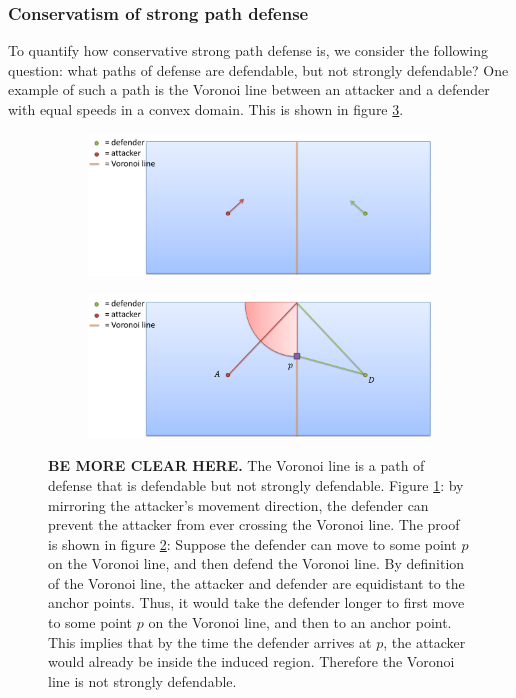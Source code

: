 \subsubsection{Conservatism of strong path defense}
To quantify how conservative strong path defense is, we consider the following question: what paths of defense are defendable, but not strongly defendable? One example of such a path is the Voronoi line between an attacker and a defender with equal speeds in a convex domain. This is shown in figure \ref{fig:voronoi_pod}.

\begin{figure}[h]
\centering

\begin{subfigure}{\textwidth}
\includegraphics[width=\textwidth]{"fig/voronoi path of defense"}
\caption{}
\label{subfig:vor_pod1}
\end{subfigure}

\begin{subfigure}{\textwidth}
\includegraphics[width=\textwidth]{"fig/voronoi path of defense proof"}
\caption{}
\label{subfig:vor_pod2}
\end{subfigure}

\caption{\textbf{BE MORE CLEAR HERE.} The Voronoi line is a path of defense that is defendable but not strongly defendable. Figure \ref{subfig:vor_pod1}: by mirroring the attacker's movement direction, the defender can prevent the attacker from ever crossing the Voronoi line. \newline\newline The proof is shown in figure \ref{subfig:vor_pod2}: Suppose the defender can move to some point $p$ on the Voronoi line, and then defend the Voronoi line. By definition of the Voronoi line, the attacker and defender are equidistant to the anchor points. Thus, it would take the defender longer to first move to some point $p$ on the Voronoi line, and then to an anchor point. This implies that by the time the defender arrives at $p$, the attacker would already be inside the induced region. Therefore the Voronoi line is not strongly defendable.}
\label{fig:voronoi_pod}
\end{figure}

